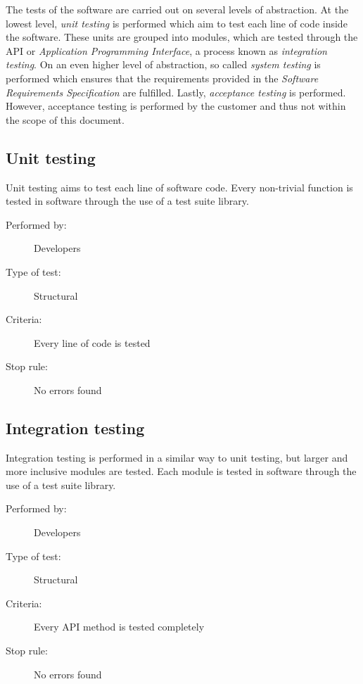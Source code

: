 \documentclass[12pt,titlepage,bibliography=totoc]{article}
\begin{document}
The tests of the software are carried out on several levels of abstraction. At
the lowest level, \textit{unit testing} is performed which aim to test each line
of code inside the software. These units are grouped into modules, which are
tested through the API or \textit{Application Programming Interface}, a process
known as \textit{integration testing}. On an even higher level of abstraction,
so called \textit{system testing} is performed which ensures that the
requirements provided in the \textit{Software Requirements Specification} are
fulfilled. Lastly, \textit{acceptance testing} is performed. However, acceptance
testing is performed by the customer and thus not within the scope of this
document.

\subsection{Unit testing}
\label{subsec:test-process-unit-testing}

Unit testing aims to test each line of software code. Every non-trivial function
is tested in software through the use of a test suite library.

\begin{description}
	\item[Performed by:]	Developers
	\item[Type of test:]	Structural
	\item[Criteria:]	Every line of code is tested
	\item[Stop rule:]	No errors found
\end{description}


\subsection{Integration testing}
\label{subsec:test-process-integration-testing}

Integration testing is performed in a similar way to unit testing, but larger
and more inclusive modules are tested. Each module is tested in software through
the use of a test suite library.

\begin{description}
	\item[Performed by:]	Developers
	\item[Type of test:]	Structural
	\item[Criteria:]	Every API method is tested completely
	\item[Stop rule:]	No errors found
\end{description}
\end{document}
